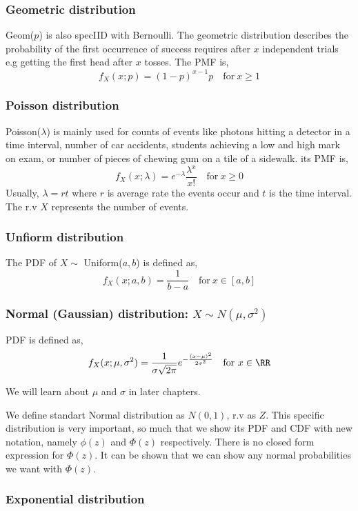 \subsubsection*{Geometric distribution}
Geom($p$) is also specIID with Bernoulli. The geometric distribution describes the probability of the first occurrence of success
requires after $x$ independent trials e.g getting the first head after $x$ tosses. The PMF is,
\[ f_{X}(x; p) = (1-p)^{x-1}p \quad \text{for} \ x \ge 1 \]

\subsubsection*{Poisson distribution}
Poisson($\lambda$) is mainly used for counts of events like photons hitting a detector in a time interval, number of car accidents, students
achieving a low and high mark on exam, or number of pieces of chewing gum on a tile of a sidewalk. its PMF is,
\[f_X(x; \lambda) = e^{-\lambda} \frac{\lambda^{x}}{x!} \quad \text{for} \ x \ge 0 \]
Usually, $\lambda = rt$ where $r$ is average rate the events occur and $t$ is the time interval. The r.v $X$ represents the number of events.

\subsubsection*{Unfiorm distribution}
The PDF of $X \sim$ Uniform($a,b$) is defined as,
\[f_X(x; a,b)= \frac{1}{b-a} \quad \text{for} \ x \in [a,b]\]

\subsubsection*{Normal (Gaussian) distribution: $X \sim N(\mu, \sigma^2)$}
PDF is defined as,
\[f_X(x; \mu, \sigma^2) = \frac{1}{\sigma \sqrt{2 \pi}}  e^{- \frac{(x- \mu)^2}{2\sigma^2}} \quad \text{for} \ x \in \RR \]

We will learn about $\mu$ and $\sigma$ in later chapters.

We define  \alert{standart Normal distribution} as $N(0,1)$, r.v as $Z$. This specific distribution is very important, so much that we
show its PDF and CDF with new notation, namely $\phi(z)$ and $\Phi(z)$ respectively. There is no closed form expression for $\Phi(z)$.
It can be shown that we can show any normal  probabilities we want with $\Phi(z)$.
\subsubsection*{Exponential distribution}

